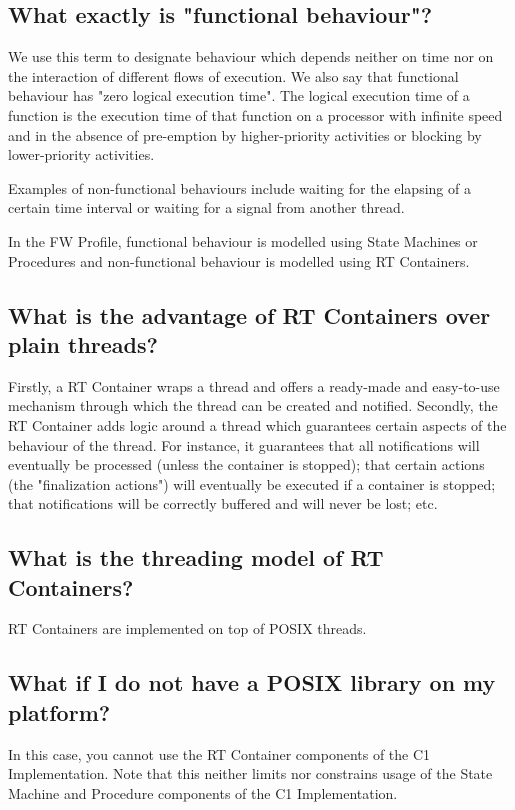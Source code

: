 \documentclass[faq]{../fwprofile}
\begin{document}
\subsection{What exactly is "functional behaviour"?}
We use this term to designate behaviour which depends neither on time nor on the interaction of different flows of execution. We also say that functional behaviour has "zero logical execution time". The logical execution time of a function is the execution time of that function on a processor with infinite speed and in the absence of pre-emption by higher-priority activities or blocking by lower-priority activities. 

Examples of non-functional behaviours include waiting for the elapsing of a certain time interval or waiting for a signal from another thread.

In the FW Profile, functional behaviour is modelled using State Machines or Procedures and non-functional behaviour is modelled using RT Containers.

\subsection{What is the advantage of RT Containers over plain threads?}
Firstly, a RT Container wraps a thread and offers a ready-made and easy-to-use mechanism through which the thread can be created and notified. Secondly, the RT Container adds logic around a thread which guarantees certain aspects of the behaviour of the thread. For instance, it guarantees that all notifications will eventually be processed (unless the container is stopped); that certain actions (the "finalization actions") will eventually be executed if a container is stopped; that notifications will be correctly buffered and will never be lost; etc.

\subsection{What is the threading model of RT Containers?}
RT Containers are implemented on top of POSIX threads.

\subsection{What if I do not have a POSIX library on my platform?}
In this case, you cannot use the RT Container components of the C1 Implementation. Note that this neither limits nor constrains usage of the State Machine and Procedure components of the C1 Implementation.
\end{document}
